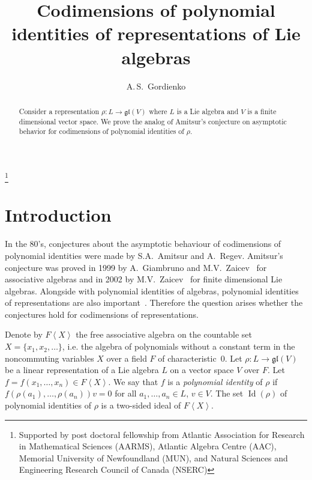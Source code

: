 \documentclass[12pt, reqno, a4paper]{amsart}
\theoremstyle{plain}
\theoremstyle{remark}
\theoremstyle{definition}
\begin{document}
\title[Codimensions of representations of Lie algebras]{Codimensions of
polynomial identities of representations of Lie algebras}

\author{A.\,S.~Gordienko}

\address{Memorial University of Newfoundland, St. John's, NL, Canada}

\begin{abstract} Consider a representation $\rho\colon L \to \mathfrak{gl}(V)$
where $L$ is a Lie algebra and $V$ is a finite dimensional vector space.
We prove the analog of Amitsur's conjecture
on asymptotic behavior
for codimensions of polynomial identities of $\rho$.
\end{abstract}

\thanks{Supported by post doctoral fellowship
from Atlantic Association for Research
in Mathematical Sciences (AARMS), Atlantic Algebra Centre (AAC),
Memorial University of Newfoundland (MUN), and
Natural Sciences and Engineering Research Council of Canada (NSERC)}

\medskip

\maketitle

\section{Introduction}

In the 80's, conjectures about the asymptotic behaviour
of codimensions of polynomial identities were made
by S.A.~Amitsur and A.~Regev.
Amitsur's conjecture was proved in 1999 by
A.~Giambruno and M.V.~Zaicev~\cite[Theorem~6.5.2]{ZaiGia}
 for associative algebras and in 2002 by M.V.~Zaicev~\cite{ZaiLie}
 for finite dimensional Lie algebras.
  Alongside with polynomial
identities of algebras, polynomial identities of representations are
also important~\cite{Razmyslov, VovsiPlotkin}.
Therefore the question arises whether the conjectures
hold for codimensions of representations.

Denote by $F \left<  X \right> $ the free associative
 algebra on the countable set $X = \{ x_1,
x_2, \ldots \}$,  i.e. the algebra of polynomials
without a constant term in the noncommuting variables $X$
over a field $F$ of characteristic~$0$.
 Let $\rho \colon L \to \mathfrak{gl}(V)$ be a linear representation
 of a Lie algebra $L$ on a
 vector space $V$ over $F$.  Let
$f=f(x_1,\ldots,x_n) \in F\left<  X \right>$.
We say that $f$ is
a \textit{polynomial identity} of $\rho$ if $f(\rho(a_1), \ldots, \rho(a_n))v=0$
for all $a_1, \ldots, a_n \in L$, $v \in V$.
  The set $\operatorname{Id}(\rho)$ of polynomial identities of $\rho$ is
a two-sided ideal of $F \left<  X \right>$.
\end{document}
